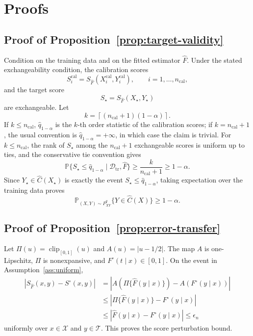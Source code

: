 \documentclass[11pt]{article}
\newcommand{\Xcal}{\mathcal X}
\newcommand{\Dcal}{\mathcal D}
\newcommand{\Tcal}{\mathcal T}
\newcommand{\Pp}{\mathbb P}
\newcommand{\abs}[1]{\left\lvert #1 \right\rvert}
\begin{document}
\appendix

\section{Proofs}
\label{app:proofs}

\subsection{Proof of Proposition~\ref{prop:target-validity}}

Condition on the training data and on the fitted estimator \(\widehat F\). Under the stated exchangeability condition, the calibration scores
\[
  S_i^{\mathrm{cal}}=S_{\widehat F}(X_i^{\mathrm{cal}},Y_i^{\mathrm{cal}}),
  \qquad i=1,\ldots,n_{\mathrm{cal}},
\]
and the target score
\[
  S_\star=S_{\widehat F}(X_\star,Y_\star)
\]
are exchangeable. Let
\[
  k=\left\lceil (n_{\mathrm{cal}}+1)(1-\alpha)\right\rceil .
\]
If \(k\le n_{\mathrm{cal}}\), \(\widehat q_{1-\alpha}\) is the \(k\)-th order statistic of the calibration scores; if \(k=n_{\mathrm{cal}}+1\), the usual convention is \(\widehat q_{1-\alpha}=+\infty\), in which case the claim is trivial. For \(k\le n_{\mathrm{cal}}\), the rank of \(S_\star\) among the \(n_{\mathrm{cal}}+1\) exchangeable scores is uniform up to ties, and the conservative tie convention gives
\[
  \Pp\{S_\star\le \widehat q_{1-\alpha}\mid \Dcal_{\mathrm{tr}},\widehat F\}
  \ge
  \frac{k}{n_{\mathrm{cal}}+1}
  \ge
  1-\alpha .
\]
Since \(Y_\star\in\widehat C(X_\star)\) is exactly the event \(S_\star\le\widehat q_{1-\alpha}\), taking expectation over the training data proves
\[
  \Pp_{(X,Y)\sim P^q_{XY}}\{Y\in\widehat C(X)\}\ge 1-\alpha .
\]

\subsection{Proof of Proposition~\ref{prop:error-transfer}}

Let \(\Pi(u)=\operatorname{clip}_{[0,1]}(u)\) and
\(A(u)=|u-1/2|\). The map \(A\) is one-Lipschitz, \(\Pi\) is
nonexpansive, and \(F^\circ(t\mid x)\in[0,1]\). On the event in
Assumption~\ref{ass:uniform},
\[
\begin{aligned}
  \abs{S_{\widehat F}(x,y)-S^\circ(x,y)}
  &=
  \abs{
  A\!\left(\Pi\{\widehat F(y\mid x)\}\right)
  -
  A\!\left(F^\circ(y\mid x)\right)
  }  \\
  &\le
  \abs{\Pi\{\widehat F(y\mid x)\}-F^\circ(y\mid x)}\\
  &\le
  \abs{\widehat F(y\mid x)-F^\circ(y\mid x)}
  \le \epsilon_n
\end{aligned}
\]
uniformly over \(x\in\Xcal\) and \(y\in\Tcal\). This proves the score perturbation bound.
\end{document}
